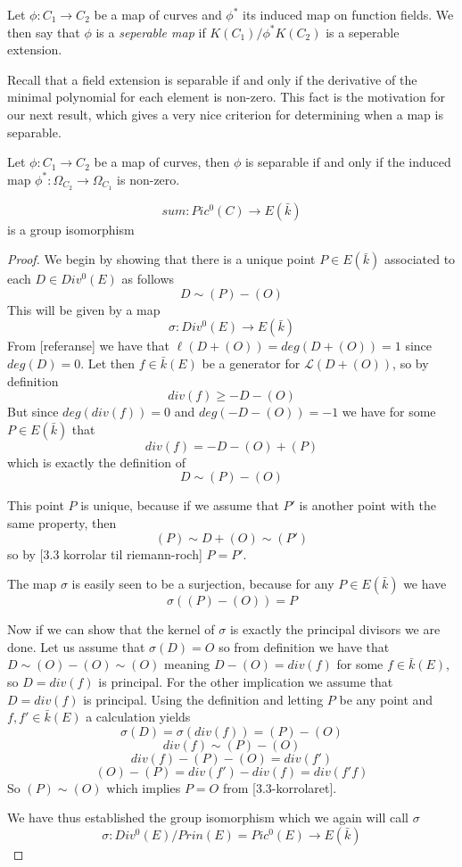 \begin{mydef}
 Let $\phi: C_1 \rightarrow C_2$ be a map of curves and $\phi^*$ its induced map on
function fields. We then say that $\phi$ is a \emph{seperable map} if
$K(C_1)/\phi^* K(C_2)$ is a seperable extension.
\end{mydef}

Recall that a field extension is separable if and only if the derivative of the minimal
polynomial for each element is non-zero. This fact is the motivation for our next result,
which gives a very nice criterion for determining when a map is separable.

\begin{prop}
 Let $\phi: C_1 \rightarrow C_2$ be a map of curves, then $\phi$ is separable if and only if
the induced map $\phi^*: \Omega_{C_2} \rightarrow \Omega_{C_1} $ is non-zero.
\end{prop}


\begin{thm}
 $$ sum: Pic^0(C) \rightarrow E(\bar{k}) $$
is a group isomorphism
\end{thm}
\begin{proof}
 We begin by showing that there is a unique point $P \in E(\bar{k})$ associated to
each $D \in Div^0(E)$ as follows
$$ D \sim (P) -(O) $$
This will be given by a map
$$ \sigma: Div^0(E) \rightarrow E(\bar{k}) $$
From [referanse] we have that $\ell(D+(O)) = deg(D+(O)) = 1$ since $deg(D) = 0$.
Let then $f \in \bar{k}(E)$ be a generator for $\mathscr{L}(D+(O))$, so by definition
$$ div(f) \geq -D-(O) $$
But since $deg(div(f)) = 0$ and $deg(-D-(O)) = -1$ we have for some $P \in E(\bar{k})$ that
$$ div(f) = -D-(O)+(P) $$
which is exactly the definition of
$$ D \sim (P) - (O) $$

This point $P$ is unique, because if we assume that $P'$ is another point with the same
property, then
$$ (P) \sim D + (O) \sim (P') $$
so by [3.3 korrolar til riemann-roch]
$ P = P'$.

The map $\sigma$ is easily seen to be a surjection, because for any $P \in E(\bar{k})$ we have
$$ \sigma((P)-(O)) = P $$

Now if we can show that the kernel of $\sigma$ is exactly the principal divisors we are done.
Let us assume that $\sigma(D) = O$ so from definition we have that $D \sim (O)-(O) \sim (O)$
meaning $D - (O) = div(f)$ for some $f \in \bar{k}(E)$, so $D = div(f)$ is principal.
For the other implication we assume that $D = div(f)$ is principal. Using the definition and
letting $P$ be any point and $f, f' \in \bar{k}(E)$ a calculation yields
$$ \sigma(D) = \sigma(div(f)) = (P)-(O) $$
$$ div(f) \sim (P) - (O) $$
$$ div(f) - (P) - (O) = div(f') $$
$$ (O) - (P) = div(f') - div(f) = div(f' f) $$
So $ (P) \sim (O) $ which implies $P = O$ from [3.3-korrolaret].

We have thus established the group isomorphism which we again will call $\sigma$
$$ \sigma : Div^0(E)/Prin(E) = Pic^0(E) \rightarrow E(\bar{k}) $$

\end{proof}
